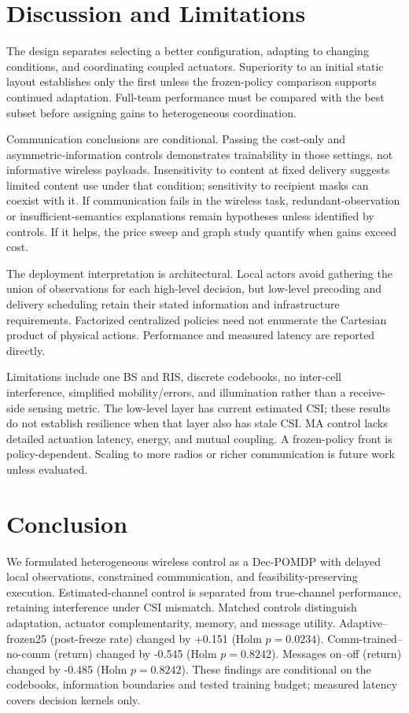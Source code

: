 \documentclass[10pt,letterpaper]{article}
\begin{document}
\section{Discussion and Limitations}
The design separates selecting a better configuration, adapting to changing conditions, and coordinating coupled actuators. Superiority to an initial static layout establishes only the first unless the frozen-policy comparison supports continued adaptation. Full-team performance must be compared with the best subset before assigning gains to heterogeneous coordination.

Communication conclusions are conditional. Passing the cost-only and asymmetric-information controls demonstrates trainability in those settings, not informative wireless payloads. Insensitivity to content at fixed delivery suggests limited content use under that condition; sensitivity to recipient masks can coexist with it. If communication fails in the wireless task, redundant-observation or insufficient-semantics explanations remain hypotheses unless identified by controls. If it helps, the price sweep and graph study quantify when gains exceed cost.

The deployment interpretation is architectural. Local actors avoid gathering the union of observations for each high-level decision, but low-level precoding and delivery scheduling retain their stated information and infrastructure requirements. Factorized centralized policies need not enumerate the Cartesian product of physical actions. Performance and measured latency are reported directly.

Limitations include one BS and RIS, discrete codebooks, no inter-cell interference, simplified mobility/errors, and illumination rather than a receive-side sensing metric. The low-level layer has current estimated CSI; these results do not establish resilience when that layer also has stale CSI. MA control lacks detailed actuation latency, energy, and mutual coupling. A frozen-policy front is policy-dependent. Scaling to more radios or richer communication is future work unless evaluated.



\section{Conclusion}
We formulated heterogeneous wireless control as a Dec-POMDP with delayed local observations, constrained communication, and feasibility-preserving execution. Estimated-channel control is separated from true-channel performance, retaining interference under CSI mismatch. Matched controls distinguish adaptation, actuator complementarity, memory, and message utility. Adaptive--frozen25 (post-freeze rate) changed by +0.151 (Holm $p=0.0234$). Comm-trained--no-comm (return) changed by -0.545 (Holm $p=0.8242$). Messages on--off (return) changed by -0.485 (Holm $p=0.8242$). These findings are conditional on the codebooks, information boundaries and tested training budget; measured latency covers decision kernels only.
\FloatBarrier
\label{lastcontentpage}
\ifdefined\previewmode

\else

\fi

\end{document}
